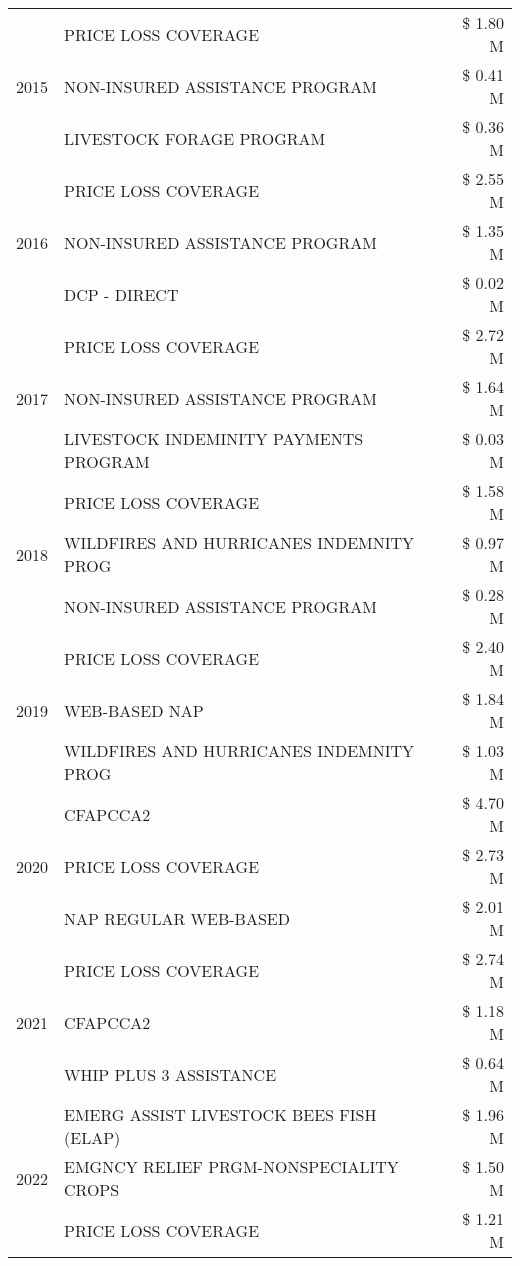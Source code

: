 \begin{tabular}{llr}
\cline{1-3}
\multirow[t]{3}{*}{2015} & PRICE LOSS COVERAGE & \$ 1.80 M \\
 & NON-INSURED ASSISTANCE PROGRAM & \$ 0.41 M \\
 & LIVESTOCK FORAGE PROGRAM & \$ 0.36 M \\
\cline{1-3}
\multirow[t]{3}{*}{2016} & PRICE LOSS COVERAGE & \$ 2.55 M \\
 & NON-INSURED ASSISTANCE PROGRAM & \$ 1.35 M \\
 & DCP - DIRECT & \$ 0.02 M \\
\cline{1-3}
\multirow[t]{3}{*}{2017} & PRICE LOSS COVERAGE & \$ 2.72 M \\
 & NON-INSURED ASSISTANCE PROGRAM & \$ 1.64 M \\
 & LIVESTOCK INDEMINITY PAYMENTS PROGRAM & \$ 0.03 M \\
\cline{1-3}
\multirow[t]{3}{*}{2018} & PRICE LOSS COVERAGE & \$ 1.58 M \\
 & WILDFIRES AND HURRICANES INDEMNITY PROG & \$ 0.97 M \\
 & NON-INSURED ASSISTANCE PROGRAM & \$ 0.28 M \\
\cline{1-3}
\multirow[t]{3}{*}{2019} & PRICE LOSS COVERAGE & \$ 2.40 M \\
 & WEB-BASED NAP & \$ 1.84 M \\
 & WILDFIRES AND HURRICANES INDEMNITY PROG & \$ 1.03 M \\
\cline{1-3}
\multirow[t]{3}{*}{2020} & CFAPCCA2 & \$ 4.70 M \\
 & PRICE LOSS COVERAGE & \$ 2.73 M \\
 & NAP REGULAR WEB-BASED & \$ 2.01 M \\
\cline{1-3}
\multirow[t]{3}{*}{2021} & PRICE LOSS COVERAGE & \$ 2.74 M \\
 & CFAPCCA2 & \$ 1.18 M \\
 & WHIP PLUS 3 ASSISTANCE & \$ 0.64 M \\
\cline{1-3}
\multirow[t]{3}{*}{2022} & EMERG ASSIST LIVESTOCK BEES FISH (ELAP) & \$ 1.96 M \\
 & EMGNCY RELIEF PRGM-NONSPECIALITY CROPS & \$ 1.50 M \\
 & PRICE LOSS COVERAGE & \$ 1.21 M \\
\cline{1-3}
\bottomrule
\end{tabular}
